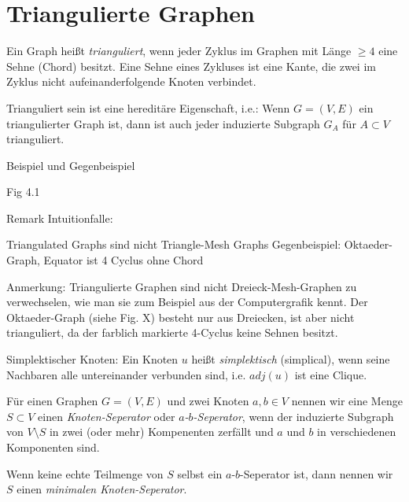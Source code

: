 \documentclass[../main.tex]{subfiles}
\begin{document}
\chapter{Triangulierte Graphen}
\label{chapter:trigulated}

\begin{definition}
    Ein Graph heißt \emph{trianguliert}, wenn jeder Zyklus im Graphen mit Länge $\geq 4$ eine Sehne (Chord) besitzt. Eine Sehne eines Zykluses ist eine Kante, die zwei im Zyklus nicht aufeinanderfolgende Knoten verbindet.
\end{definition}

\begin{bemerkung}
    Trianguliert sein ist eine hereditäre Eigenschaft, i.e.: Wenn $G = (V, E)$ ein triangulierter Graph ist, dann ist auch jeder induzierte Subgraph $G_A$ für $A \subset V$ trianguliert.
\end{bemerkung}

Beispiel und Gegenbeispiel

    Fig 4.1

Remark Intuitionfalle:

    Triangulated Graphs sind nicht Triangle-Mesh Graphs
    Gegenbeispiel: Oktaeder-Graph, Equator ist 4 Cyclus ohne Chord

    Anmerkung: Triangulierte Graphen sind nicht Dreieck-Mesh-Graphen zu verwechselen, wie man sie zum Beispiel aus der Computergrafik kennt. Der Oktaeder-Graph (siehe Fig. X) besteht nur aus Dreiecken, ist aber nicht trianguliert, da der farblich markierte 4-Cyclus keine Sehnen besitzt.

\begin{definition}
    Simplektischer Knoten: Ein Knoten $u$ heißt \emph{simplektisch} (simplical), wenn seine Nachbaren alle untereinander verbunden sind, i.e. $adj(u)$ ist eine Clique.
\end{definition}


\begin{definition}
    Für einen Graphen $G = (V, E)$ und zwei Knoten $a, b \in V$ nennen wir eine Menge $S \subset V$ einen \emph{Knoten-Seperator} oder \emph{$a$-$b$-Seperator}, wenn der induzierte Subgraph von $V \setminus S$ in zwei (oder mehr) Kompenenten zerfällt und $a$ und $b$ in verschiedenen Komponenten sind.
    
    Wenn keine echte Teilmenge von $S$ selbst ein $a$-$b$-Seperator ist, dann nennen wir $S$ einen \emph{minimalen Knoten-Seperator}.
\end{definition}
\end{document}
